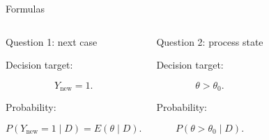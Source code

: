 \documentclass[aspectratio=43,10pt]{beamer}
\begin{document}
\begin{frame}{Formulas}

  \begin{columns}[T,onlytextwidth]


    \begin{block}{Question 1: next case}

      Decision target:

      \[
      Y_{\mathrm{new}}=1.
      \]

      Probability:

      \[
      P(Y_{\mathrm{new}}=1\mid D)
      =E(\theta\mid D).
      \]

    \end{block}


    \begin{block}{Question 2: process state}

      Decision target:

      \[
      \theta>\theta_0.
      \]

      Probability:

      \[
      P(\theta>\theta_0\mid D).
      \]
      
    \end{block}

  \end{columns}

\end{frame}

\end{document}
